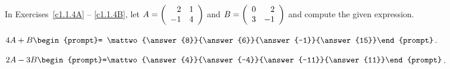 \documentclass{ximera}
\begin{document}
\noindent In Exercises~\ref{c1.1.4A} -- \ref{c1.1.4B}, let
$A=\left(\begin{array}{rr} 2 & 1\\ -1 &4\end{array}\right)$ and $B=\left(\begin{array}{rr} 0 & 2\\ 3 &-1\end{array}\right)$ and compute the given 
expression.
\begin{exercise}\label{c1.1.4A}
  $4A+B\begin{prompt}= \mattwo{\answer{8}}{\answer{6}}{\answer{-1}}{\answer{15}}\end{prompt}$.
\end{exercise}
\begin{exercise}\label{c1.1.4B}
  $2A-3B\begin{prompt}=\mattwo{\answer{4}}{\answer{-4}}{\answer{-11}}{\answer{11}}\end{prompt}$.
\end{exercise}
\end{document}
